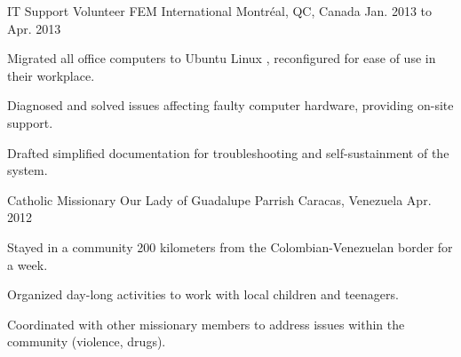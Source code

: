 \begin{cventries}
  \cventry
    {IT Support Volunteer} %
    {FEM International} %
    {Montréal, QC, Canada} %
    {Jan. 2013 to Apr. 2013} %
    {
      \begin{cvitems} %
        \item {Migrated all office computers to Ubuntu Linux , reconfigured for ease of use in their workplace.}
        \item {Diagnosed and solved issues affecting faulty computer hardware, providing on-site support.}
        \item {Drafted simplified documentation for troubleshooting and self-sustainment of the system.}
      \end{cvitems}
    }
    \vspace{2.0mm}

  \cventry
    {Catholic Missionary} %
    {Our Lady of Guadalupe Parrish} %
    {Caracas, Venezuela} %
    {Apr. 2012} %
    {
      \begin{cvitems} %
        \item {Stayed in a community 200 kilometers from the Colombian-Venezuelan border for a week.}
        \item {Organized day-long activities to work with local children and teenagers.}
        \item {Coordinated with other missionary members to address issues within the community (violence, drugs).}
      \end{cvitems}
    }
    \vspace{2.0mm}
    

\end{cventries}
